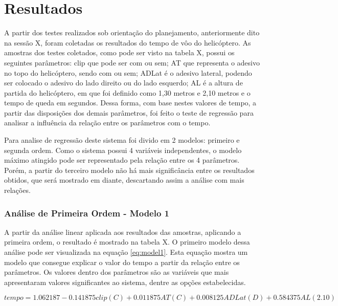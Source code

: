 \chapter{Resultados}

A partir dos testes realizados sob orientação do planejamento, anteriormente dito na sessão X, foram coletadas os resultados do tempo de vôo do helicóptero. As amostras dos testes coletados, como pode ser visto na tabela X, possui os seguintes parâmetros: clip que pode ser com ou sem; AT que representa o adesivo no topo do helicóptero, sendo com ou sem; ADLat é o adesivo lateral, podendo ser colocado o adesivo do lado direito ou do lado esquerdo; AL é a altura de partida do helicóptero, em que foi definido como 1,30 metros e 2,10 metros e o tempo de queda em segundos. Dessa forma, com base nestes valores de tempo, a partir das disposições dos demais parâmetros, foi feito o teste de regressão para analisar a influência da relação entre os parâmetros com o tempo.


Para analise de regressão deste sistema foi divido em 2 modelos: primeiro e segunda ordem. Como o sistema possui 4 variáveis independentes, o modelo máximo atingido pode ser representado pela relação entre os 4 parâmetros. Porém, a partir do terceiro modelo não há mais significância entre os resultados obtidos, que será mostrado em diante, descartando assim a análise com mais relações. 

\subsection{Análise de Primeira Ordem - Modelo 1}

A partir da análise linear aplicada aos resultados das amostras, aplicando a primeira ordem, o resultado é mostrado na tabela X. O primeiro modelo dessa análise pode ser visualizada na equação \ref{eq:model1}. Esta equação mostra um modelo que consegue explicar o valor do tempo a partir da relação entre os parâmetros. Os valores dentro dos parâmetros são as variáveis que mais apresentaram valores significantes ao sistema, dentre as opções estabelecidas. 


\begin{equation}
    tempo = 1.062187 - 0.141875clip(C) + 0.011875AT(C) + 0.008125ADLat(D) + 0.584375AL(2.10)
    \label{eq:model1}
\end{equation}

